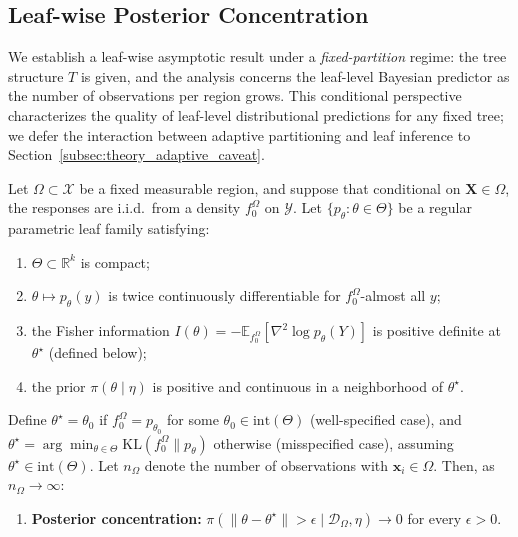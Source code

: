 \documentclass[twoside,11pt]{article}
\begin{document}
\subsection{Leaf-wise Posterior Concentration}\label{subsec:theory_leaf_consistency}

We establish a leaf-wise asymptotic result under a \emph{fixed-partition} regime: the tree structure $T$ is given, and the analysis concerns the leaf-level Bayesian predictor as the number of observations per region grows. This conditional perspective characterizes the quality of leaf-level distributional predictions for any fixed tree; we defer the interaction between adaptive partitioning and leaf inference to Section~\ref{subsec:theory_adaptive_caveat}.

\begin{proposition}\label{prop:leaf_concentration}
Let $\Omega \subset \mathcal{X}$ be a fixed measurable region, and suppose that conditional on $\mathbf{X}\in\Omega$, the responses are i.i.d.\ from a density $f_0^\Omega$ on $\mathcal{Y}$.
Let $\{p_\theta:\theta\in\Theta\}$ be a regular parametric leaf family satisfying:
\begin{enumerate}[label=(\roman*)]
    \item $\Theta \subset \mathbb{R}^k$ is compact;
    \item $\theta \mapsto p_\theta(y)$ is twice continuously differentiable for $f_0^\Omega$-almost all $y$;
    \item the Fisher information $I(\theta) = -\mathbb{E}_{f_0^\Omega}[\nabla^2 \log p_\theta(Y)]$ is positive definite at $\theta^\star$ (defined below);
    \item the prior $\pi(\theta \mid \eta)$ is positive and continuous in a neighborhood of $\theta^\star$.
\end{enumerate}
Define $\theta^\star = \theta_0$ if $f_0^\Omega = p_{\theta_0}$ for some $\theta_0 \in \mathrm{int}(\Theta)$ (well-specified case), and $\theta^\star = \arg\min_{\theta \in \Theta} \mathrm{KL}(f_0^\Omega \| p_\theta)$ otherwise (misspecified case), assuming $\theta^\star \in \mathrm{int}(\Theta)$. Let $n_\Omega$ denote the number of observations with $\mathbf{x}_i \in \Omega$. Then, as $n_\Omega \to \infty$:

\begin{enumerate}[label=(\alph*)]
    \item \textbf{Posterior concentration:} $\pi(\|\theta - \theta^\star\| > \epsilon \mid \mathcal{D}_\Omega, \eta) \to 0$ for every $\epsilon > 0$.


\end{enumerate}
\end{proposition}
\end{document}
